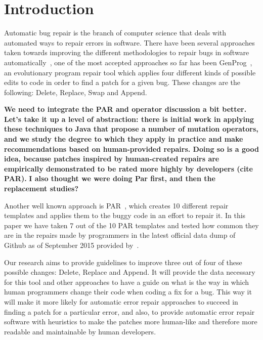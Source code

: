 \documentclass{sig-alternate-05-2015}
\newcommand{\todo}[1]
  {{\scriptsize \textbf{\color{red} {#1}}}}
\begin{document}


\section{Introduction}

Automatic bug repair is the branch of computer science that deals with automated
ways to repair errors in software. There have been several approaches taken
towards improving the different methodologies to repair bugs in software
automatically~\cite{kim2013,weimer2009,legoues2012,pan2009}, one of the
most accepted approaches so far has been GenProg~\cite{weimer2009,legoues2012}, an
evolutionary program repair tool which applies four different kinds of possible
edits to code in order to find a patch for a given bug. These changes are the
following: Delete, Replace, Swap and Append.

\todo{We need to integrate the PAR and operator discussion a bit better.  Let's
  take it up a level of abstraction: there is initial work in applying these
  techniques to Java that propose a number of mutation operators, and we study
  the degree to which they apply in practice and make recommendations based on
  human-provided repairs.  Doing so is a good idea, because patches inspired by
  human-created repairs are empirically demonstrated to be rated more highly by
  developers (cite PAR).}
\todo{I also thought we were doing Par first, and then the replacement studies?}

Another well known approach is PAR~\cite{kim2013}, which creates 10 different
repair templates and applies them to the buggy code in an effort to repair
it. In this paper we have taken 7 out of the 10 PAR templates and tested how
common they are in the repairs made by programmers in the latest official data
dump of Github as of September 2015 provided by~\cite{dyer2013}.

Our research aims to provide guidelines to improve three out of four of these
possible changes: Delete, Replace and Append. It will provide the data necessary
for this tool and other approaches to have a guide on what is the way in which
human programmers change their code when coding a fix for a bug. This way it
will make it more likely for automatic error repair approaches to succeed in
finding a patch for a particular error, and also, to provide automatic error
repair software with heuristics to make the patches more human-like and
therefore more readable and maintainable by human developers.
\end{document}
